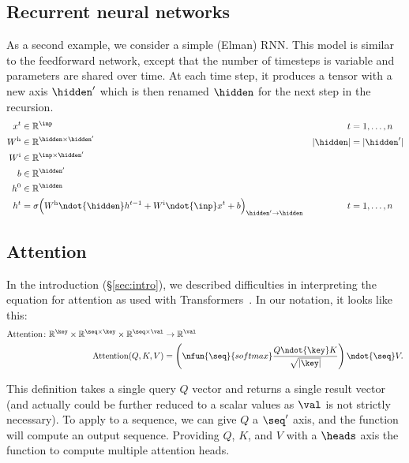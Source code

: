 \subsection{Recurrent neural networks}
\label{sec:rnn}

As a second example, we consider a simple (Elman) RNN. This model is similar to the feedforward network, except that the number of timesteps is variable and parameters are shared over time. At each time step, it produces a tensor with a new axis $\hidden'$ which is then renamed $\hidden$ for the next step in the recursion. 
\begin{align*}
x^{t} &\in \mathbb{R}^{\inp} & t &= 1, \ldots, n \\
W^{\text{h}} &\in \mathbb{R}^{\hidden \times \hidden'} & |\hidden| &= |\hidden'| \\
W^{\text{i}} &\in \mathbb{R}^{\inp \times \hidden'} \\
b &\in \mathbb{R}^{\hidden'} \\
h^{0} &\in \mathbb{R}^{\hidden} \\
h^{t} &= \sigma\Bigl( W^{\text{h}} \ndot{\hidden} h^{t-1} + W^{\text{i}} \ndot{\inp} x^{t} + b \Bigr)_{\hidden'\rightarrow\hidden} & t &= 1, \ldots, n
\end{align*}

\subsection{Attention}
\label{sec:attention}

In the introduction (\S\ref{sec:intro}), we described difficulties in interpreting the equation for attention as used with Transformers~\citep{vaswani+:2017}. In our notation, it looks like this:
\begin{align}
  \text{Attention} \colon \mathbb{R}^{\key} \times \mathbb{R}^{\seq \times\key} \times \mathbb{R}^{\seq \times\val} &\rightarrow \mathbb{R}^{\val} \\
  \text{Attention}(Q,K,V) &= \left( \nfun{\seq}{softmax} \frac{Q \ndot{\key} K}{\sqrt{|\key|}} \right) \ndot{\seq} V. \label{eq:def_att}
\end{align}

This definition takes a single query $Q$ vector and returns a single result vector (and actually could be further reduced to a scalar values as $\val$ is not strictly necessary). To apply to a sequence, we can give $Q$ a $\seq'$ axis, and the function will compute an output sequence. Providing $Q$, $K$, and $V$ with a $\heads$ axis \liftsVBZ{} the function to compute multiple attention heads. 

